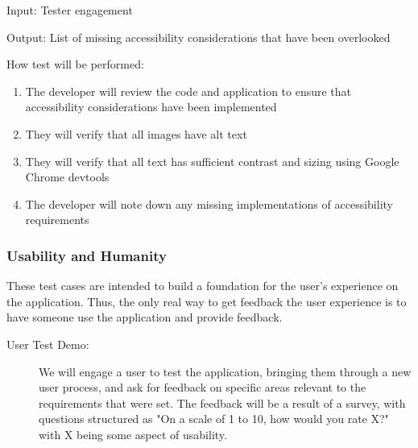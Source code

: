 \documentclass[12pt, titlepage]{article}
\begin{document}
\begin{enumerate}
Input: Tester engagement
					
Output: List of missing accessibility considerations that have been overlooked
					
How test will be performed: 
\begin{enumerate}
  \item The developer will review the code and application to ensure that accessibility considerations have been implemented
  \item They will verify that all images have alt text
  \item They will verify that all text has sufficient contrast and sizing using Google Chrome devtools
  \item The developer will note down any missing implementations of accessibility requirements
\end{enumerate}

\end{enumerate}

\subsubsection{Usability and Humanity}
These test cases are intended to build a foundation for the user's experience
on the application. Thus, the only real way to get feedback the user experience
is to have someone use the application and provide feedback.

\begin{description}
  \item[User Test Demo:] We will engage a user to test the application, bringing
  them through a new user process, and ask for feedback on specific areas
  relevant to the requirements that were set. The feedback will be a result of a
  survey, with questions structured as "On a scale of 1 to 10, how would you
  rate X?" with X being some aspect of usability. 
  
\end{description}
\end{document}
